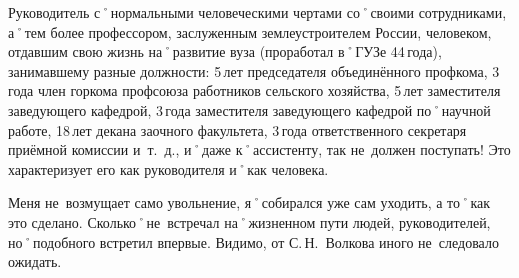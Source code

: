 Руководитель с˚нормальными человеческими чертами со˚своими сотрудниками, а˚тем более профессором, заслуженным землеустроителем России, человеком, отдавшим свою жизнь на˚развитие вуза (проработал в˚ГУЗе 44\,года), занимавшему разные должности: 5\,лет председателя объединённого профкома, 3\,года член горкома профсоюза работников сельского хозяйства, 5\,лет заместителя заведующего кафедрой, 3\,года заместителя заведующего кафедрой по˚научной работе, 18\,лет декана заочного факультета, 3\,года ответственного секретаря приёмной комиссии и~т.~д., и˚даже к˚ассистенту, так не~должен поступать! Это характеризует его как руководителя и˚как человека.

Меня не~возмущает само увольнение, я˚собирался уже сам уходить, а то˚как это сделано. Сколько˚не~встречал на˚жизненном пути людей, руководителей, но˚подобного встретил впервые. Видимо, от С.\,Н.~Волкова иного не~следовало ожидать.